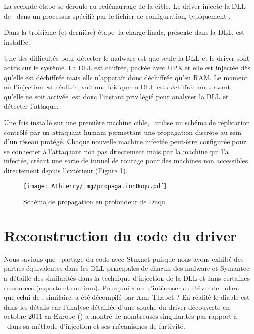 La seconde étape se déroule au redémarrage de la cible.
Le driver injecte la DLL de \Duqu\ dans un processus spécifié par le fichier de configuration, typiquement \service.

Dans la troisième (et dernière) étape, la charge finale, présente dans la DLL, est installée.

Une des difficultés pour détecter le malware est que seule la DLL et le driver sont actifs sur le système. La DLL est chiffrée, packée avec UPX et elle est injectée dès qu'elle est déchiffrée mais elle n'apparaît donc déchiffrée qu'en RAM. Le moment où l'injection est réalisée, soit une fois que la DLL est déchiffrée mais avant qu'elle ne soit activée, est donc l'instant privilégié pour analyser la DLL et détecter l'attaque.


Une fois installé sur une première machine cible, \Duqu\ utilise un schéma de réplication contrôlé par un attaquant humain permettant une propagation discrète au sein d'un réseau protégé. Chaque nouvelle
machine infectée peut-être configurée pour se connecter à l'attaquant non pas directement mais par la machine qui l'a infectée, créant une sorte de tunnel de routage pour des machines non accessibles directement
depuis l'extérieur (Figure \ref{fig:AThierry_propagationDuqu}). 

\begin{figure}
\begin{center}
 \texttt{[image: AThierry/img/propagationDuqu.pdf]}
\end{center}
\caption{Schéma de propagation en profondeur de Duqu}
\label{fig:AThierry_propagationDuqu}
\end{figure}


\section{Reconstruction du code du driver}
Nous savions que \Duqu\ partage du code avec Stuxnet puisque nous avons exhibé des parties équivalentes dans les DLL principales de chacun des malware \cite{AThierry_REAT12} et Symantec a détaillé des similarités dans la technique d'injection de la DLL et dans certaines ressources (exports et routines).
Pourquoi alors s'intéresser au driver de \Duqu\ alors que celui de \Stuxnet, similaire, a été décompilé par Amr Thabet \cite{AThierry_ThabetDriver} ?
En réalité le diable est dans les détails car l'analyse détaillée d'une souche du driver découverte en octobre 2011 en Europe (\driver) a montré de nombreuses singularités par rapport à \Stuxnet\ dans sa méthode d'injection et ses mécanismes de furtivité.

